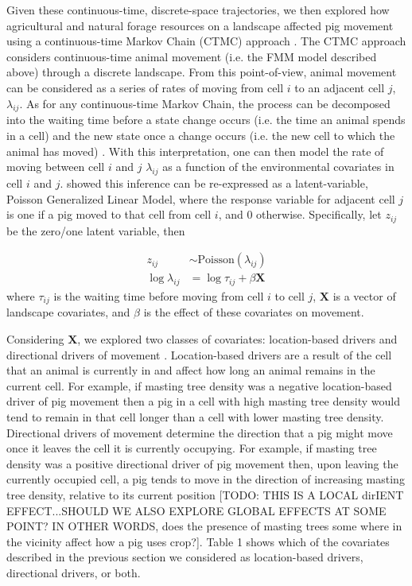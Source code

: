 \documentclass[a4paper]{article}
\begin{document}
Given these continuous-time, discrete-space trajectories, we then explored how agricultural and natural forage resources on a landscape affected pig movement using a continuous-time Markov Chain (CTMC) approach \cite{Hanks2015}. The CTMC approach considers continuous-time animal movement (i.e. the FMM model described above) through a discrete landscape. From this point-of-view, animal movement can be considered as a series of rates of moving from cell $i$ to an adjacent cell $j$, $\lambda_{ij}$.  As for any continuous-time Markov Chain, the process can be decomposed into the waiting time before a state change occurs (i.e. the time an animal spends in a cell) and the new state once a change occurs (i.e. the new cell to which the animal has moved) \citep{Allen2003a}.  With this interpretation, one can then model the rate of moving between cell $i$ and $j$ $\lambda_{ij}$ as a function of the environmental covariates in cell $i$ and $j$.  \cite{Hanks2015} showed this inference can be re-expressed as a latent-variable, Poisson Generalized Linear Model, where the response variable for adjacent cell $j$ is one if a pig moved to that cell from cell $i$, and 0 otherwise. Specifically, let $z_{ij}$ be the zero/one latent variable, then

\begin{align}
  z_{ij} &\sim \text{Poisson}(\lambda_{ij}) \\
  \log \lambda_{ij} &= \log{\tau_{ij}} + \beta \mathbf{X}
\end{align}
where $\tau_{ij}$ is the waiting time before moving from cell $i$ to cell $j$, $\mathbf{X}$ is a vector of landscape covariates, and $\beta$ is the effect of these covariates on movement.  

Considering $\mathbf{X}$, we explored two classes of covariates: location-based drivers and directional drivers of movement \citep{Hanks2015}.  Location-based drivers are a result of the cell that an animal is currently in and affect how long an animal remains in the current cell.  For example, if masting tree density was a negative location-based driver of pig movement then a pig in a cell with high masting tree density would tend to remain in that cell longer than a cell with lower masting tree density. Directional drivers of movement determine the direction that a pig might move once it leaves the cell it is currently occupying.  For example, if masting tree density was a positive directional driver of pig movement then, upon leaving the currently occupied cell, a pig tends to move in the direction of increasing masting tree density, relative to its current position [TODO: THIS IS A LOCAL dirIENT EFFECT...SHOULD WE ALSO EXPLORE GLOBAL EFFECTS AT SOME POINT? IN OTHER WORDS, does the presence of masting trees some where in the vicinity affect how a pig uses crop?]. Table 1 shows which of the covariates described in the previous section we considered as location-based drivers, directional drivers, or both.  
\end{document}
